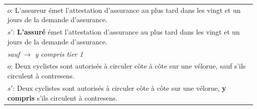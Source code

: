 \begin{tabular}{@{}p{}@{}}
\footnotesize $o$: L’assureur émet l’attestation d’assurance au plus tard dans les vingt et un jours de la demande d’assurance. \\[1pt]
\footnotesize $s'$: \textbf{L’assuré} émet l’attestation d’assurance au plus tard dans les vingt et un jours de la demande d’assurance. \\
\midrule
\emph{sauf} $\rightarrow$ \emph{y compris} \hfill \emph{tier 1} \\[1pt]
\footnotesize $o$: Deux cyclistes sont autorisés à circuler côte à côte sur une vélorue, sauf s’ils circulent à contresens. \\[1pt]
\footnotesize $s'$: Deux cyclistes sont autorisés à circuler côte à côte sur une vélorue, \textbf{y compris} s’ils circulent à contresens. \\
\bottomrule
\end{tabular}

